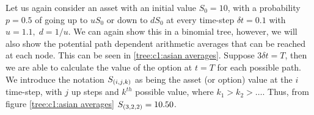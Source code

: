 Let us again consider an asset with an initial value \(S_0 = 10\), with a probability \(p = 0.5\) of going up to \(uS_0\) or down to \(dS_0\) at every time-step \(\delta t = 0.1\) with \(u=1.1,\;d=1/u\). We can again show this in a binomial tree, however, we will also show the potential path dependent arithmetic averages that can be reached at each node. This can be seen in \autoref{tree:c1:asian averages}.
\nline{}
Suppose \(3\delta t = T\), then we are able to calculate the value of the option at \(t=T\) for each possible path. We introduce the notation \(S_{\left(i,j,k\right)}\) as being the asset (or option) value at the \(i\) time-step, with \(j\) up steps and \(k^{th}\) possible value, where \(k_1 > k_2 > \dots \). Thus, from figure \autoref{tree:c1:asian averages} \(S_{\left(3,2,2\right)} = 10.50\).

\begin{figure}[H]
    \centering
\end{figure}
